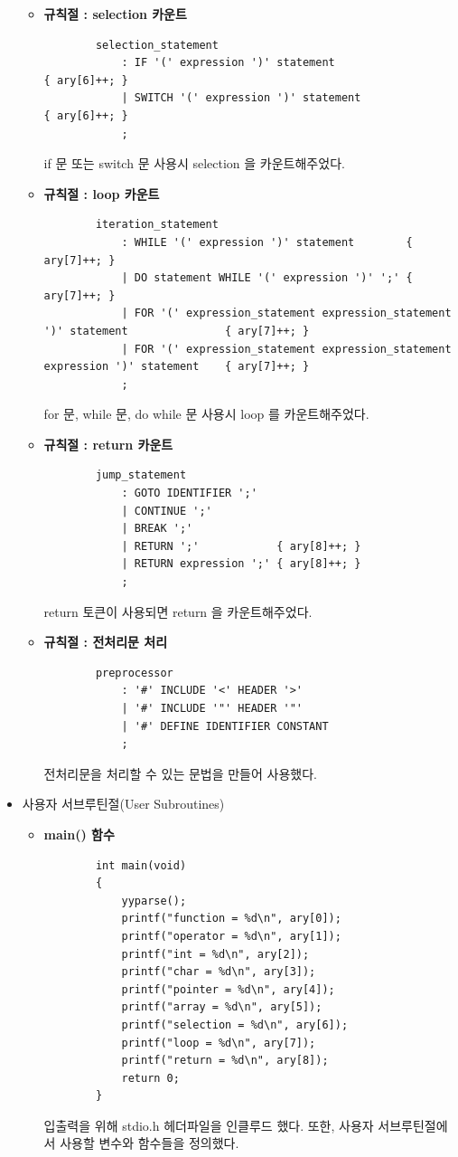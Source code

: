 \documentclass{article}
\begin{document}
\begin{itemize}
\begin{itemize}
		\item {\bf 규칙절 : selection 카운트}
		\begin{lstlisting}
		selection_statement
			: IF '(' expression ')' statement					{ ary[6]++; }
			| SWITCH '(' expression ')' statement				{ ary[6]++; }
			;
		\end{lstlisting}
		if 문 또는 switch 문 사용시 selection 을 카운트해주었다.

		\item {\bf 규칙절 : loop 카운트}
		\begin{lstlisting}
		iteration_statement
			: WHILE '(' expression ')' statement		{ ary[7]++; }
			| DO statement WHILE '(' expression ')' ';'	{ ary[7]++; }
			| FOR '(' expression_statement expression_statement ')' statement				{ ary[7]++; }
			| FOR '(' expression_statement expression_statement expression ')' statement	{ ary[7]++; }
			;
		\end{lstlisting}
		for 문, while 문, do while 문 사용시 loop 를 카운트해주었다.

		\item {\bf 규칙절 : return 카운트}
		\begin{lstlisting}
		jump_statement
			: GOTO IDENTIFIER ';'
			| CONTINUE ';'
			| BREAK ';'
			| RETURN ';'			{ ary[8]++; }
			| RETURN expression ';'	{ ary[8]++; }
			;
		\end{lstlisting}
		return 토큰이 사용되면 return 을 카운트해주었다.

		\item {\bf 규칙절 : 전처리문 처리}
		\begin{lstlisting}
		preprocessor
			: '#' INCLUDE '<' HEADER '>'
			| '#' INCLUDE '"' HEADER '"'
			| '#' DEFINE IDENTIFIER CONSTANT
			;
		\end{lstlisting}
		전처리문을 처리할 수 있는 문법을 만들어 사용했다.
	\end{itemize}

	\item 사용자 서브루틴절(User Subroutines)	
	\begin{itemize}
		\item {\bf main() 함수}
		\begin{lstlisting}
		int main(void)
		{
			yyparse();
			printf("function = %d\n", ary[0]);
			printf("operator = %d\n", ary[1]);
			printf("int = %d\n", ary[2]);
			printf("char = %d\n", ary[3]);
			printf("pointer = %d\n", ary[4]);
			printf("array = %d\n", ary[5]);
			printf("selection = %d\n", ary[6]);
			printf("loop = %d\n", ary[7]);
			printf("return = %d\n", ary[8]);
			return 0;
		}
		\end{lstlisting}
		입출력을 위해 stdio.h 헤더파일을 인클루드 했다.
		또한, 사용자 서브루틴절에서 사용할 변수와 함수들을 정의했다.
	

\end{itemize}
\end{itemize}
\end{document}
